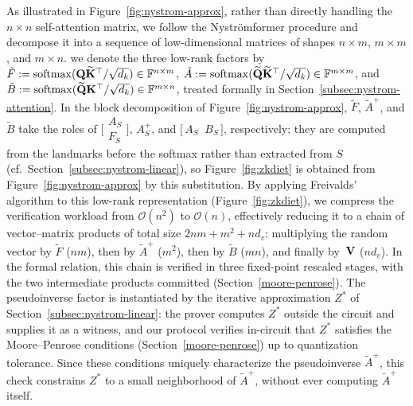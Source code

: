 \documentclass[sigconf,anonymous,review,balance=false]{acmart}
\newcommand{\rev}[1]{{\color{magenta}#1}}
\begin{document}
As illustrated in Figure~\ref{fig:nystrom-approx}, rather than directly handling the $n \times n$ self-attention matrix, we follow the Nyströmformer procedure and decompose it into a sequence of low-dimensional matrices of shapes $n \times m$, $m \times m$, and $m \times n$. we denote the three low-rank factors by
\rev{$\tilde{F} := {\mathrm{softmax}}({\mathbf{Q}}\widetilde{{\mathbf{K}}}^{\top}/\sqrt{d_k}) \in \mathbb{F}^{n \times m}$},
\rev{$\tilde{A} := {\mathrm{softmax}}(\widetilde{{\mathbf{Q}}}\widetilde{{\mathbf{K}}}^{\top}/\sqrt{d_k}) \in \mathbb{F}^{m \times m}$}, and
\rev{$\tilde{B} := {\mathrm{softmax}}(\widetilde{{\mathbf{Q}}}{\mathbf{K}}^{\top}/\sqrt{d_k}) \in \mathbb{F}^{m \times n}$},
treated formally in Section~\ref{subsec:nystrom-attention}.
In the block decomposition of Figure~\ref{fig:nystrom-approx}, $\tilde{F}$, $\tilde{A}^{+}$, and
$\tilde{B}$ take the roles of
$\bigl[\begin{smallmatrix} A_S \\ F_S \end{smallmatrix}\bigr]$,
$A_S^{+}$, and $\bigl[\, A_S \;\; B_S \,\bigr]$, respectively;
they are computed from the landmarks before the softmax rather than
extracted from $S$ (cf.\ Section~\ref{subsec:nystrom-linear}), so Figure~\ref{fig:zkdiet} is obtained from
Figure~\ref{fig:nystrom-approx} by this substitution. By applying Freivalds’ algorithm to this low-rank representation (Figure~\ref{fig:zkdiet}), we compress the verification workload from \rev{$\mathcal{O}(n^2)$} to \rev{$\mathcal{O}(n)$}, effectively reducing it to a chain of vector--matrix products of total size $2nm + m^2 + nd_v$: multiplying the random vector by $\tilde{F}$ ($nm$), then by $\tilde{A}^{+}$ ($m^2$), then by $\tilde{B}$ ($mn$), and finally by~${\mathbf{V}}$ ($nd_v$). \rev{In the formal relation, this chain is verified in three fixed-point rescaled stages, with the two intermediate products committed (Section~\ref{moore-penrose}).} The pseudoinverse factor is instantiated by the iterative approximation $Z^{*}$ of Section~\ref{subsec:nystrom-linear}: the prover computes $Z^{*}$ outside the circuit and supplies it as a witness, and our protocol verifies in-circuit that $Z^{*}$ satisfies the Moore--Penrose conditions (Section~\ref{moore-penrose}) up to quantization tolerance. Since these conditions uniquely characterize the pseudoinverse $\tilde{A}^{+}$, this check constrains $Z^{*}$ to a small neighborhood of $\tilde{A}^{+}$, without ever computing $\tilde{A}^{+}$ itself.

\end{document}

